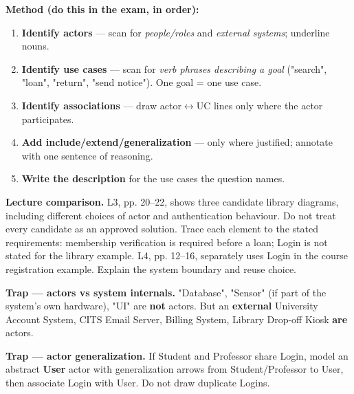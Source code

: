 \begin{studycolumns}
\vspace{0pt}

\textbf{Method (do this in the exam, in order):}

\begin{enumerate}
\item \textbf{Identify actors} --- scan for \emph{people/\allowbreak{}roles} and \emph{external systems}; underline nouns.
\item \textbf{Identify use cases} --- scan for \emph{verb phrases describing a goal} ("search", "loan", "return", "send notice"). One goal = one use case.
\item \textbf{Identify associations} --- draw actor\ensuremath{\leftrightarrow}UC lines only where the actor participates.
\item \textbf{Add include/\allowbreak{}extend/\allowbreak{}generalization} --- only where justified; annotate with one sentence of reasoning.
\item \textbf{Write the description} for the use cases the question names.
\end{enumerate}
\textbf{Lecture comparison.} L3, pp. 20--22, shows three candidate library diagrams, including different choices of actor and authentication behaviour. Do not treat every candidate as an approved solution. Trace each element to the stated requirements: membership verification is required before a loan; Login is not stated for the library example. L4, pp. 12--16, separately uses Login in the course registration example. Explain the system boundary and reuse choice.

\textbf{Trap --- actors vs system internals.} "Database", "Sensor" (if part of the system's own hardware), "UI" are \textbf{not} actors. But an \textbf{external} University Account System, CITS Email Server, Billing System, Library Drop-off Kiosk \textbf{are} actors.

\textbf{Trap --- actor generalization.} If Student and Professor share Login, model an abstract \textbf{User} actor with generalization arrows from Student/\allowbreak{}Professor to User, then associate Login with User. Do not draw duplicate Logins.
\end{studycolumns}
